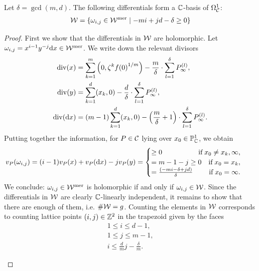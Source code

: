 \documentclass[main.tex]{subfiles}
\begin{document}
     \begin{prop}\label{prop:holom_diff}
 Let $\delta = \gcd(m,d)$. The following differentials form  a $\mathbb{C}$-basis of $\Omega^1_{\mathcal{C}}$:
 \begin{align}\label{eq:holm_diff}
   \mathcal{W} =  \left\{  \omega_{i,j} \in \mathcal{W}^{\text{mer}}  \mid  -mi + jd - \delta \ge 0  \right\}
 \end{align}
     \end{prop}
     \begin{proof}
      First we show that the differentials in $\mathcal{W}$ are holomorphic.
      Let $\omega_{i,j} = x^{i-1}y^{-j} \mathrm d x \in \mathcal{W}^{\text{mer}}$. We write down the relevant divisors
      \begin{align*}
       \operatorname{div}(x) & = \sum_{k=1}^m \left(0,\zeta^k{f(0)}^{1/m}\right) - \frac{m}{\delta} \cdot \sum_{l = 1}^{\delta} P_{\infty}^{(l)}, \\
       \operatorname{div}(y) & = \sum_{k = 1}^d (x_k,0) - \frac{d}{\delta} \cdot \sum_{l = 1}^{\delta}  P_{\infty}^{(l)}, \\
       \operatorname{div}(\mathrm d x) & = (m-1)\sum_{k = 1}^d (x_k,0) - \left(\frac{m}{\delta} + 1\right)\cdot \sum_{l = 1}^{\delta}  P_{\infty}^{(l)}.
      \end{align*}
     Putting together the information, for $P \in \mathcal{C}$ lying over $x_0 \in \mathbb{P}^1_{\mathbb{C}}$, we obtain
     \begin{align}\label{eq:diff_cases}
      v_P(\omega_{i,j}) & = (i-1) v_P(x) + v_P(\dx)  - j v_P(y) =
 \begin{cases}
  \ge 0 \hfill \text{if} \; x_0 \ne x_k,\infty, \\
  = m-1-j \ge 0 \quad \text{if} \; x_0 = x_k, \\
  = \frac{(-mi-\delta+jd)}{\delta} \hfill \text{if}\;  x_0 = \infty.
 \end{cases}
     \end{align}
     We conclude: $\omega_{i,j} \in \mathcal{W}^{\text{mer}}$ is holomorphic if and only if $\omega_{i,j} \in \mathcal{W}$. \abstand
     Since the differentials in $\mathcal{W}$ are clearly $\mathbb{C}$-linearly independent, it remains to show that
     there are enough of them, i.e. $\#\mathcal{W} = g$. \abstand
     Counting the elements in $\mathcal{W}$ corresponds to counting lattice points $(i,j) \in \mathbb{Z}^2$ in the trapezoid given by the faces
     \begin{align*}
 1 \le i \le d-1,\\
 1 \le j \le m-1, \\
 i \le \frac{d}{m}j - \frac{\delta}{m}.
     \end{align*}
      \begin{figure}[H]

\end{figure}
\end{proof}
\end{document}
